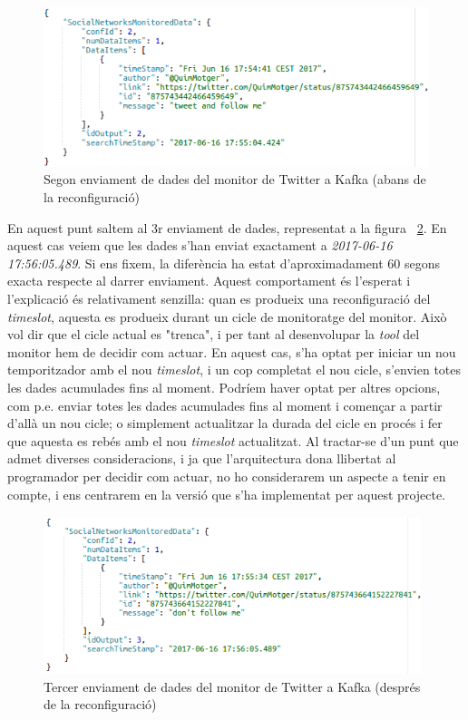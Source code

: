 \begin{figure}[H]
\centering
\includegraphics[width=14cm]{Figures/tfg2}
\decoRule
\caption{Segon enviament de dades del monitor de Twitter a Kafka (abans de la reconfiguració)}
\label{fig:tfg2}
\end{figure} 

En aquest punt saltem al 3r enviament de dades, representat a la figura ~\ref{fig:tfg3}. En aquest cas veiem que les dades s'han enviat exactament a \textit{2017-06-16 17:56:05.489}. Si ens fixem, la diferència ha estat d'aproximadament 60 segons exacta respecte al darrer enviament. Aquest comportament és l'esperat i l'explicació és relativament senzilla: quan es produeix una reconfiguració del \textit{timeslot}, aquesta es produeix durant un cicle de monitoratge del monitor. Això vol dir que el cicle actual es "trenca", i per tant al desenvolupar la \textit{tool} del monitor hem de decidir com actuar. En aquest cas, s'ha optat per iniciar un nou temporitzador amb el nou \textit{timeslot}, i un cop completat el nou cicle, s'envien totes les dades acumulades fins al moment. Podríem haver optat per altres opcions, com p.e. enviar totes les dades acumulades fins al moment i començar a partir d'allà un nou cicle; o simplement actualitzar la durada del cicle en procés i fer que aquesta es rebés amb el nou \textit{timeslot} actualitzat. Al tractar-se d'un punt que admet diverses consideracions, i ja que l'arquitectura dona llibertat al programador per decidir com actuar, no ho considerarem un aspecte a tenir en compte, i ens centrarem en la versió que s'ha implementat per aquest projecte.\\

\begin{figure}[H]
\centering
\includegraphics[width=11cm]{Figures/tfg3}
\decoRule
\caption{Tercer enviament de dades del monitor de Twitter a Kafka (després de la reconfiguració)}
\label{fig:tfg3}
\end{figure} 

